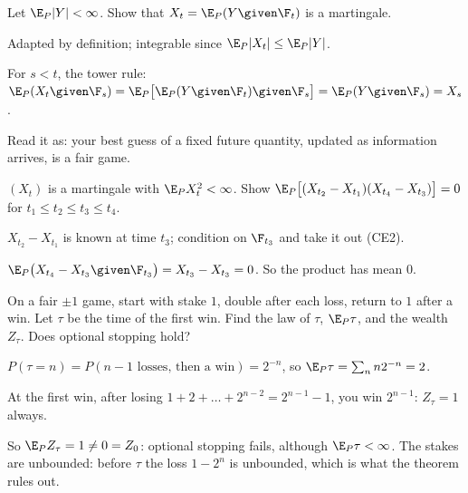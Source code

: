 \begin{problem}
Let $\E_P|Y|<\infty$. Show that $X_t=\E_P(Y\given\F_t)$ is a martingale.
\begin{steps}
  \item Adapted by definition; integrable since $\E_P|X_t|\le\E_P|Y|$.
  \item For $s<t$, the tower rule: $\E_P(X_t\given\F_s)=\E_P\big[\E_P(Y\given\F_t)\given\F_s\big]=\E_P(Y\given\F_s)=X_s$.
\end{steps}
Read it as: your best guess of a fixed future quantity, updated as information arrives, is a fair game.
\end{problem}

\begin{problem}
$(X_t)$ is a martingale with $\E_PX_t^2<\infty$. Show $\E_P\big[(X_{t_2}-X_{t_1})(X_{t_4}-X_{t_3})\big]=0$ for $t_1\le t_2\le t_3\le t_4$.
\begin{steps}
  \item $X_{t_2}-X_{t_1}$ is known at time $t_3$; condition on $\F_{t_3}$ and take it out (CE2).
  \item $\E_P\big(X_{t_4}-X_{t_3}\given\F_{t_3}\big)=X_{t_3}-X_{t_3}=0$. So the product has mean $0$.
\end{steps}
\end{problem}

\begin{problem}
On a fair $\pm1$ game, start with stake $1$, double after each loss, return to $1$ after a win. Let $\tau$ be the time of the first win. Find the law of $\tau$, $\E_P\tau$, and the wealth $Z_\tau$. Does optional stopping hold?
\begin{steps}
  \item $P(\tau=n)=P(\text{$n-1$ losses, then a win})=2^{-n}$, so $\E_P\tau=\sum_nn2^{-n}=2$.
  \item At the first win, after losing $1+2+\dots+2^{n-2}=2^{n-1}-1$, you win $2^{n-1}$: $Z_\tau=1$ always.
  \item So $\E_PZ_\tau=1\ne0=Z_0$: optional stopping fails, although $\E_P\tau<\infty$. The stakes are unbounded: before $\tau$ the loss $1-2^n$ is unbounded, which is what the theorem rules out.
\end{steps}
\end{problem}

